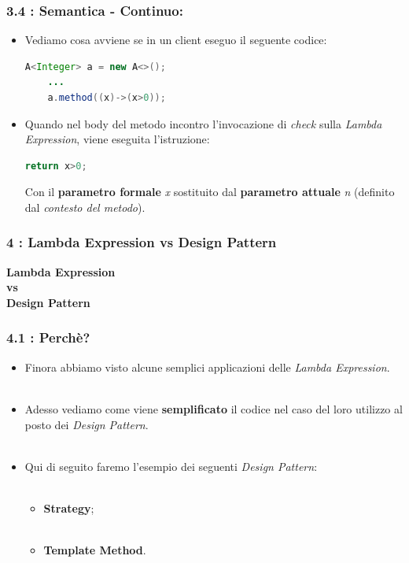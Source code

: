 \documentclass{beamer}
\begin{document}

\begin{frame}[fragile]
	\frametitle{\textbf{3.4 : Semantica - Continuo:}}
	\begin{itemize}
		\item	
			Vediamo cosa avviene se in un client eseguo il seguente codice:
\begin{lstlisting}[language=Java]
	A<Integer> a = new A<>();
	...
	a.method((x)->(x>0));
\end{lstlisting}
		\item
			Quando nel body del metodo incontro l'invocazione di \textit{check} sulla \textit{Lambda Expression}, viene eseguita l'istruzione:
\begin{lstlisting}[language=Java]
	return x>0;
\end{lstlisting}
			Con il \textbf{parametro formale} \textit{x} sostituito dal \textbf{parametro attuale} \textit{n} (definito dal \textit{contesto del metodo}).
	\end{itemize}
\end{frame}



\begin{frame}
	\frametitle{\textbf{4 : Lambda Expression vs Design Pattern}}
	\begin{center}
		\textbf{\Huge Lambda Expression\\ vs\\ Design Pattern}
	\end{center}
\end{frame}


\begin{frame}[fragile]
	\frametitle{\textbf{4.1 : Perchè?}}
	\begin{itemize}
		\item
			Finora abbiamo visto alcune semplici applicazioni delle \textit{Lambda Expression}.\\\
		\item
			Adesso vediamo come viene \textbf{semplificato} il codice nel caso del loro utilizzo al posto dei \textit{Design Pattern}.\\\
		\item
			Qui di seguito faremo l'esempio dei seguenti \textit{Design Pattern}:\\\
			\begin{itemize}
				\item
					\textbf{Strategy};\\\
				\item
					\textbf{Template Method}.
			\end{itemize}
	\end{itemize}
\end{frame}
\end{document}
